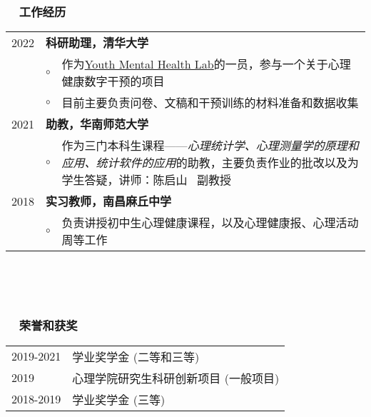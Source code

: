 \documentclass[a4paper, 12pt]{ctexart}
\begin{document}
\subsubsection*{ \ \ 工作经历}

\begin{tabularx}{\textwidth}{p{2cm} p{0.1cm} X}

    2022 & \multicolumn{2}{X}{\textbf{科研助理，清华大学}} \\
    & $ \circ $ & 作为\href{https://www.ymhlab.com}{Youth Mental Health Lab}的一员，参与一个关于心理健康数字干预的项目 \\
    & $ \circ $ & 目前主要负责问卷、文稿和干预训练的材料准备和数据收集 \\
    

    2021 & \multicolumn{2}{X}{\textbf{助教，华南师范大学}} \\
    & $ \circ $ & 作为三门本科生课程——\textit{心理统计学、心理测量学的原理和应用、统计软件的应用}的助教，主要负责作业的批改以及为学生答疑，讲师：陈启山 \ 副教授 \\

    2018 & \multicolumn{2}{X}{\textbf{实习教师，南昌麻丘中学}} \\
    & $ \circ $ & 负责讲授初中生心理健康课程，以及心理健康报、心理活动周等工作

    \end{tabularx}

\  \par 
\  \par 


\subsubsection*{ \ \ 荣誉和获奖}

\begin{tabularx}{\textwidth}{p{2cm} X}

    2019-2021 & 学业奖学金 (二等和三等)\\

    2019 & 心理学院研究生科研创新项目 (一般项目) \\
    
    2018-2019 & 学业奖学金 (三等)  \\
    
\end{tabularx}
\end{document}
